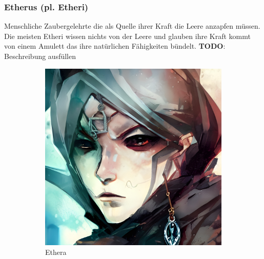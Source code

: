 \documentclass[11pt, twoside]{article}
\begin{document}
\subsubsection{Etherus (pl. Etheri)\label{etheri}}
\label{sec:org8667594}
Menschliche Zaubergelehrte die als Quelle ihrer Kraft die Leere anzapfen müssen. Die meisten Etheri wissen nichts von der Leere und glauben ihre Kraft kommt von einem Amulett das ihre natürlichen Fähigkeiten bündelt.
\textbf{TODO}: Beschreibung ausfüllen
\begin{figure}[H]
\centering
\caption{Etheri}
\label{fig:etheri}
  \begin{subfigure}{0.3\textwidth}
    \centering
    \includegraphics[width=0.99\linewidth]{etheri1.jpeg}
    \caption{Ethera}
  \end{subfigure}%
  \begin{subfigure}{0.3\textwidth}
    \centering

\end{subfigure}
\end{figure}
\end{document}
